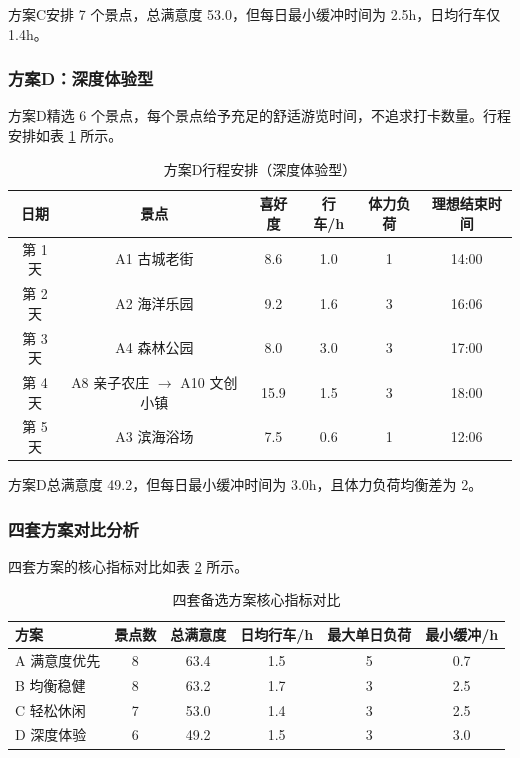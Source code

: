 方案C安排 7 个景点，总满意度 53.0，但每日最小缓冲时间为 2.5h，日均行车仅 1.4h。

\subsubsection{方案D：深度体验型}

方案D精选 6 个景点，每个景点给予充足的舒适游览时间，不追求打卡数量。行程安排如表 \ref{tab:planD} 所示。

\begin{table}[H]
\centering
\caption{方案D行程安排（深度体验型）}
\label{tab:planD}
\begin{tabular}{cccccc}
\toprule
日期 & 景点 & 喜好度 & 行车/h & 体力负荷 & 理想结束时间 \\
\midrule
第 1 天 & A1 古城老街 & 8.6 & 1.0 & 1 & 14:00 \\
第 2 天 & A2 海洋乐园 & 9.2 & 1.6 & 3 & 16:06 \\
第 3 天 & A4 森林公园 & 8.0 & 3.0 & 3 & 17:00 \\
第 4 天 & A8 亲子农庄 $\rightarrow$ A10 文创小镇 & 15.9 & 1.5 & 3 & 18:00 \\
第 5 天 & A3 滨海浴场 & 7.5 & 0.6 & 1 & 12:06 \\
\bottomrule
\end{tabular}
\end{table}

方案D总满意度 49.2，但每日最小缓冲时间为 3.0h，且体力负荷均衡差为 2。

\subsubsection{四套方案对比分析}

四套方案的核心指标对比如表 \ref{tab:plan_compare} 所示。

\begin{table}[H]
\centering
\caption{四套备选方案核心指标对比}
\label{tab:plan_compare}
\begin{tabular}{lccccc}
\toprule
方案 & 景点数 & 总满意度 & 日均行车/h & 最大单日负荷 & 最小缓冲/h \\
\midrule
A 满意度优先 & 8 & 63.4 & 1.5 & 5 & 0.7 \\
B 均衡稳健 & 8 & 63.2 & 1.7 & 3 & 2.5 \\
C 轻松休闲 & 7 & 53.0 & 1.4 & 3 & 2.5 \\
D 深度体验 & 6 & 49.2 & 1.5 & 3 & 3.0 \\
\bottomrule
\end{tabular}
\end{table}

